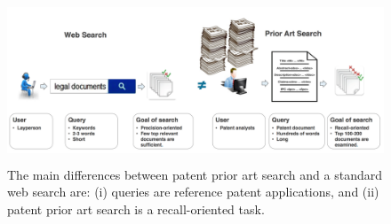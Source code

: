 
\begin{figure}[htpb]
   \centering
   \includegraphics[width=\textwidth,height=49mm]{figs/webprior.png}
   \caption{The main differences between patent prior art search and a standard web search are: (i) queries are reference patent
applications, and (ii) patent prior art search is a recall-oriented task.}  
   \label{fig:webprior} 
\end{figure}
\FloatBarrier
